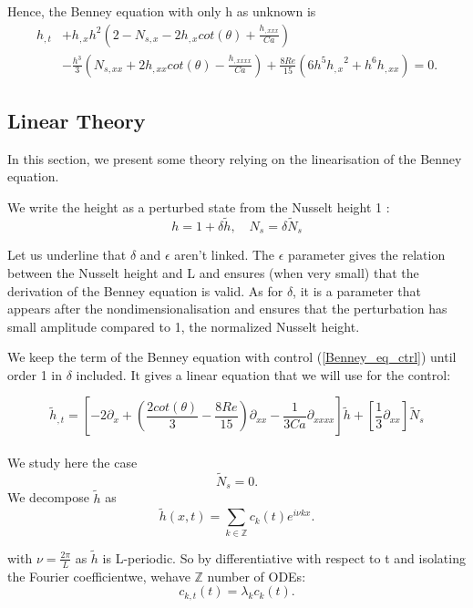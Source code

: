 \documentclass[12pt]{article}
\begin{document}
Hence, the Benney equation with only h as unknown is 
\begin{equation}\label{Benney_eq_ctrl}
\boxed{
\begin{aligned}
    h_{,t} &+ h_{,x}h^2 \left( 2-N_{s, x}-2h_{,x}cot(\theta) + \frac{h_{,xxx}}{Ca}\right) \\ &- \frac{h^3}{3}\left(N_{s, xx} + 2h_{,xx}cot(\theta)  - \frac{h_{,xxxx}}{Ca} \right)
    + \frac{8Re}{15} \left( 6h^5 {h_{,x}}^2 + h^6 h_{,xx} \right) = 0.
\end{aligned}
}
\end{equation}

\subsection{Linear Theory}\label{subsubsection_linear_theory}
In this section, we present some theory relying on the linearisation of the Benney equation. 

We write the height as a perturbed state from the Nusselt height 1 : 
\begin{equation}\label{h_linear_decomposition}
    \boxed{
    h = 1+\delta \tilde{h},\quad N_s = \delta \tilde{N}_s
    }
\end{equation}

Let us underline that $\delta$ and $\epsilon$ aren't linked. The $\epsilon$ parameter gives the relation between 
the Nusselt height and L and ensures (when very small) that the derivation of the Benney equation is valid. As for $\delta$, 
it is a parameter that appears after the nondimensionalisation and ensures that the perturbation has small amplitude compared 
to 1, the normalized Nusselt height. 

We  keep the term of the Benney equation with control (\ref{Benney_eq_ctrl}) until order 1 in $\delta$ included. It gives a linear equation that we will use for the control:

\begin{equation}\label{Benney_ctrl_linearised}
    \boxed{
    \tilde{h}_{,t} = \left[ -2\partial_x + (\frac{2cot(\theta)}{3}-\frac{8Re}{15})\partial_{xx} - \frac{1}{3Ca}\partial_{xxxx}\right]\tilde{h} + \left[ \frac{1}{3}\partial_{xx}\right]\tilde{N}_s
    }
\end{equation}
\\
We study here the case $$\tilde{N}_s = 0.$$
We decompose $\tilde{h}$ as $$\tilde{h}(x,t) = \sum_{k\in\mathbb{Z}}c_k(t)e^{i\nu kx}.$$

 with $\nu =\frac{2\pi}{L}$ as $\tilde{h}$ is L-periodic. So by differentiative with respect to t and isolating the Fourier coefficientwe,  
wehave $\mathbb{Z}$ number of ODEs: 
\begin{equation}\label{Fourier_mode}
    c_{k, t}(t) = \lambda_k c_k(t).
\end{equation}
\end{document}
